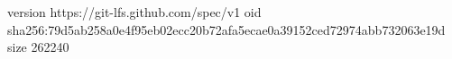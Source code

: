 version https://git-lfs.github.com/spec/v1
oid sha256:79d5ab258a0e4f95eb02ecc20b72afa5ecae0a39152ced72974abb732063e19d
size 262240
